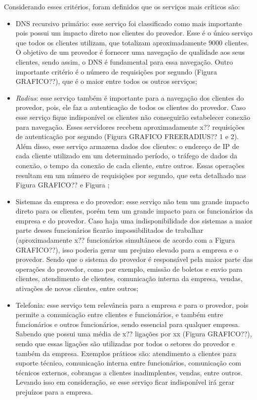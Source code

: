 Considerando esses critérios, foram definidos que os serviços mais críticos são:
\begin{itemize}
 \item \ac{DNS} recursivo primário: esse serviço foi classificado como mais importante pois possui um impacto direto nos clientes do provedor. Esse 
 é o único serviço que todos os clientes utilizam, que totalizam aproximadamente 9000 clientes. O objetivo de um provedor é fornecer uma 
 navegação de qualidade aos seus clientes, sendo assim, o \ac{DNS} é fundamental para essa navegação. Outro importante critério é o 
 número de requisições por segundo (Figura GRAFICO??), que é o maior entre todos os outros serviços;
 
 \item \textit{Radius}: esse serviço também é importante para a navegação dos clientes do provedor, pois, ele faz a autenticação de todos os 
 clientes do provedor. Caso esse serviço fique indisponível os clientes não conseguirão estabelecer conexão para navegação. Esses servidores 
 recebem aproximadamente x?? requisições de autenticação por segundo (Figura GRAFICO FREERADIUS?? 1 e 2). Além disso, esse serviço armazena dados dos 
 clientes: o endereço de \ac{IP} de cada cliente utilizado em um determinado período, o tráfego de dados da conexão, o tempo da conexão de cada 
 cliente, entre outros. Essas operações resultam em um número de requisições por segundo, que esta detalhado nas Figura GRAFICO?? e Figura ;
 
 \item Sistemas da empresa e do provedor: esse serviço não tem um grande impacto direto para os clientes, porém tem um grande impacto para os 
 funcionários da empresa e do provedor. Caso haja uma indisponibilidade dos sistemas a maior parte desses funcionários ficarão 
 impossibilitados de trabalhar (aproximadamente x?? funcionários simultâneos de acordo com a Figura GRAFICO??), isso poderia gerar um prejuizo 
 elevado para a empresa e o provedor. Sendo que o sistema do provedor é responsável pela maior parte das operações do provedor, 
 como por exemplo, emissão de boletos e envio para clientes, atendimento de clientes, comunicação interna da empresa, vendas, 
 ativações de novos clientes, entre outros;
 
 \item Telefonia: esse serviço tem relevância para a empresa e para o provedor, pois permite a comunicação entre clientes e funcionários, 
 e também entre funcionários e outros funcionários, sendo essencial para qualquer empresa. Sabendo que possui uma média de x?? ligações por xx
 (Figura GRAFICO??), sendo que essas ligações são utilizadas por todos o setores do provedor e também da empresa. Exemplos práticos são: 
 atendimento a clientes para suporte técnico, comunicação interna entre funcionários, comunicação com técnicos externos, cobranças a clientes 
 inadimplentes, vendas, entre outros. Levando isso em consideração, se esse serviço ficar indisponível irá gerar prejuízos para a empresa.
\end{itemize}

